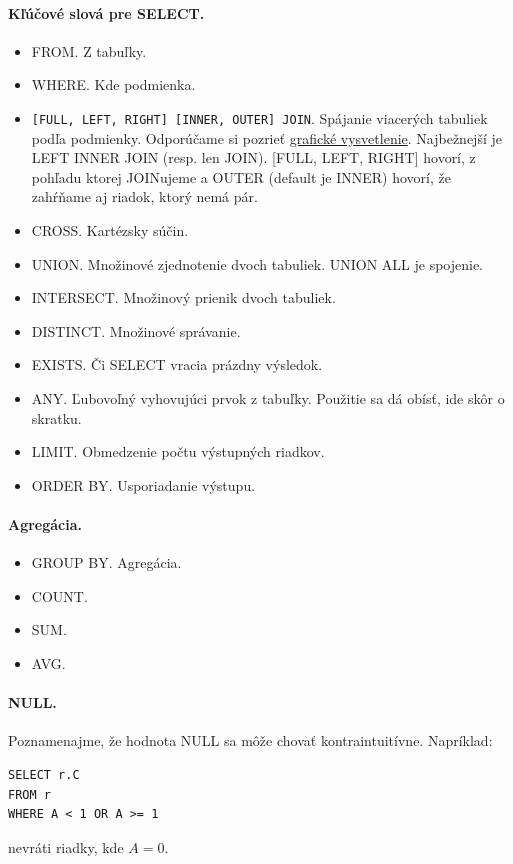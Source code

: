 \documentclass[10pt,a4paper]{article}
\begin{document}
\paragraph{Kľúčové slová pre SELECT.}
\begin{itemize}
\item FROM. Z tabuľky.
\item WHERE. Kde podmienka.
\item \verb|[FULL, LEFT, RIGHT] [INNER, OUTER] JOIN|. Spájanie viacerých tabuliek podľa podmienky. Odporúčame si pozrieť \href{http://www.codinghorror.com/blog/2007/10/a-visual-explanation-of-sql-joins.html}{grafické vysvetlenie}. Najbežnejší je LEFT INNER JOIN (resp. len JOIN). [FULL, LEFT, RIGHT] hovorí, z pohľadu ktorej JOINujeme a OUTER (default je INNER) hovorí, že zahŕňame aj riadok, ktorý nemá pár.
\item CROSS. Kartézsky súčin.
\item UNION. Množinové zjednotenie dvoch tabuliek. UNION ALL je spojenie.
\item INTERSECT. Množinový prienik dvoch tabuliek.
\item DISTINCT. Množinové správanie.
\item EXISTS. Či SELECT vracia prázdny výsledok.
\item ANY. Ľubovoľný vyhovujúci prvok z tabuľky. Použitie sa dá obísť, ide skôr o skratku.
\item LIMIT. Obmedzenie počtu výstupných riadkov.
\item ORDER BY. Usporiadanie výstupu.
\end{itemize}

\paragraph{Agregácia.}
\begin{itemize}
\item GROUP BY. Agregácia.
\item COUNT.
\item SUM.
\item AVG.
\end{itemize}

\paragraph{NULL.}
Poznamenajme, že hodnota NULL sa môže chovať kontraintuitívne.
Napríklad:
\begin{verbatim}
SELECT r.C
FROM r
WHERE A < 1 OR A >= 1
\end{verbatim}
nevráti riadky, kde $A=0$.
\end{document}
